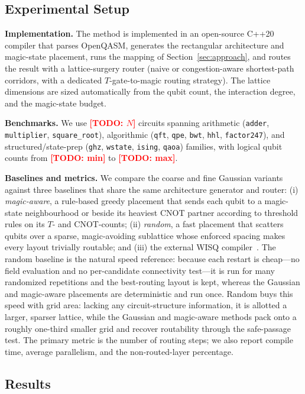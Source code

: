 \documentclass[10pt,conference]{IEEEtran}
\theoremstyle{definition}
\theoremstyle{remark}
\newcommand{\todo}[1]{\textcolor{red}{\textbf{[TODO: #1]}}}
\begin{document}
\subsection{Experimental Setup}

\textbf{Implementation.} The method is implemented in an open-source C++20
compiler that parses OpenQASM, generates the rectangular architecture and
magic-state placement, runs the mapping of Section~\ref{sec:approach}, and
routes the result with a lattice-surgery router (naive or congestion-aware
shortest-path corridors, with a dedicated $T$-gate-to-magic routing strategy).
The lattice dimensions are sized automatically from the qubit count, the
interaction degree, and the magic-state budget.

\textbf{Benchmarks.} We use \todo{$N$} circuits spanning arithmetic
(\texttt{adder}, \texttt{multiplier}, \texttt{square\_root}), algorithmic
(\texttt{qft}, \texttt{qpe}, \texttt{bwt}, \texttt{hhl}, \texttt{factor247}),
and structured/state-prep (\texttt{ghz}, \texttt{wstate}, \texttt{ising},
\texttt{qaoa}) families, with logical qubit counts from \todo{min} to
\todo{max}.

\textbf{Baselines and metrics.} We compare the coarse and fine Gaussian variants
against three baselines that share the same architecture generator and router:
(i) \emph{magic-aware}, a rule-based greedy placement that sends each qubit to a
magic-state neighbourhood or beside its heaviest CNOT partner according to
threshold rules on its $T$- and CNOT-counts; (ii) \emph{random}, a fast
placement that scatters qubits over a sparse, magic-avoiding sublattice whose
enforced spacing makes every layout trivially routable; and (iii) the external
WISQ compiler~\cite{wisq}. The random baseline is the natural speed reference:
because each restart is cheap---no field evaluation and no per-candidate
connectivity test---it is run for many randomized repetitions and the
best-routing layout is kept, whereas the Gaussian and magic-aware placements are
deterministic and run once. Random buys this speed with grid area: lacking any
circuit-structure information, it is allotted a larger, sparser lattice, while
the Gaussian and magic-aware methods pack onto a roughly one-third smaller grid
and recover routability through the safe-passage test. The primary metric is the
number of routing steps; we also report compile time, average parallelism, and
the non-routed-layer percentage.

\subsection{Results}
\end{document}

